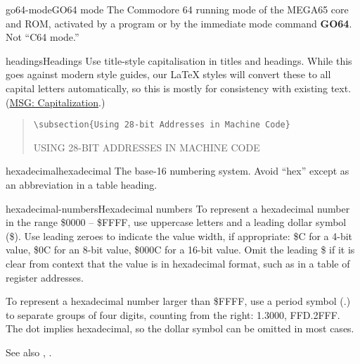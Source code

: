 \begin{sgentry}{go64-mode}{GO64 mode}
    The Commodore 64 running mode of the MEGA65 core and ROM, activated by a program or by the immediate mode command \textbf{GO64}. Not ``C64 mode.''
\end{sgentry}

\begin{sgentry}{headings}{Headings}
    Use title-style capitalisation in titles and headings. While this goes against modern style guides, our LaTeX styles will convert these to all capital letters automatically, so this is mostly for consistency with existing text. (\href{https://learn.microsoft.com/en-us/style-guide/capitalization}{MSG: Capitalization}.)

    \begin{quote}
        \texttt{{\textbackslash}subsection\{Using 28-bit Addresses in Machine Code\}}

        \hrulefill

        {\large USING 28-BIT ADDRESSES IN MACHINE CODE}
    \end{quote}
\end{sgentry}

\begin{sgentry}{hexadecimal}{hexadecimal}
    The base-16 numbering system. Avoid ``hex'' except as an abbreviation in a table heading.
\end{sgentry}

\begin{sgentry}{hexadecimal-numbers}{Hexadecimal numbers}
    To represent a hexadecimal number in the range \$0000 -- \$FFFF, use uppercase letters and a leading dollar symbol (\$). Use leading zeroes to indicate the value width, if appropriate: \$C for a 4-bit value, \$0C for an 8-bit value, \$000C for a 16-bit value. Omit the leading \$ if it is clear from context that the value is in hexadecimal format, such as in a table of register addresses.

    To represent a hexadecimal number larger than \$FFFF, use a period symbol (.) to separate groups of four digits, counting from the right: 1.3000, FFD.2FFF. The dot implies hexadecimal, so the dollar symbol can be omitted in most cases.

    See also , .
\end{sgentry}

